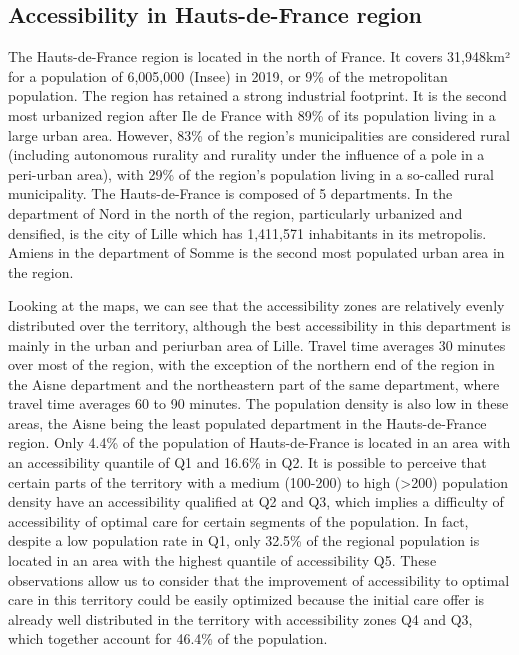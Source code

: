 \subsection*{Accessibility in Hauts-de-France region}

The Hauts-de-France region is located in the north of France. It covers
31,948km² for a population of 6,005,000 (Insee) in 2019, or 9\% of the
metropolitan population. The region has retained a strong industrial footprint.
It is the second most urbanized region after Ile de France with 89\% of its
population living in a large urban area. However, 83\% of the region's
municipalities are considered rural (including autonomous rurality and rurality
under the influence of a pole in a peri-urban area), with 29\% of the region's
population living in a so-called rural municipality. The Hauts-de-France is
composed of 5 departments. In the department of Nord in the north of the region,
particularly urbanized and densified, is the city of Lille which has 1,411,571
inhabitants in its metropolis. Amiens in the department of Somme is the second
most populated urban area in the region.

Looking at the maps, we can see that the accessibility zones are relatively
evenly distributed over the territory, although the best accessibility in this
department is mainly in the urban and periurban area of Lille. Travel time
averages 30 minutes over most of the region, with the exception of the northern
end of the region in the Aisne department and the northeastern part of the same
department, where travel time averages 60 to 90 minutes. The population density
is also low in these areas, the Aisne being the least populated department in
the Hauts-de-France region. Only 4.4\% of the population of Hauts-de-France is
located in an area with an accessibility quantile of Q1 and 16.6\% in Q2. It is
possible to perceive that certain parts of the territory with a medium (100-200)
to high (>200) population density have an accessibility qualified at Q2 and Q3,
which implies a difficulty of accessibility of optimal care for certain segments
of the population. In fact, despite a low population rate in Q1, only 32.5\% of
the regional population is located in an area with the highest quantile of
accessibility Q5. These observations allow us to consider that the improvement
of accessibility to optimal care in this territory could be easily optimized
because the initial care offer is already well distributed in the territory with
accessibility zones Q4 and Q3, which together account for 46.4\% of the
population.

